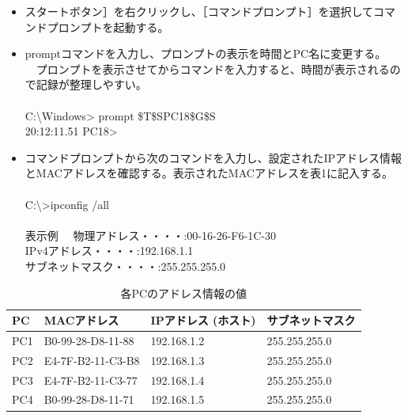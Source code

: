 \documentclass[10pt]{article}
\begin{document}
\begin{enumerate}
\begin{itemize}
                \item スタートボタン］を右クリックし、［コマンドプロンプト］を選択してコマンドプロンプトを起動する。
                \item promptコマンドを入力し、プロンプトの表示を時間とPC名に変更する。 　プロンプトを表示させてからコマンドを入力すると、時間が表示されるので記録が整理しやすい。
                     \\\\
                    C:\textbackslash Windows> prompt \$T\$SPC18\$G\$S \\
                    20:12:11.51 PC18>
                    \\
                \item コマンドプロンプトから次のコマンドを入力し、設定されたIPアドレス情報とMACアドレスを確認する。表示されたMACアドレスを表1に記入する。
                \\\\
                C:\textbackslash>ipconfig /all
                \\\\
                表示例 　物理アドレス・・・・:00-16-26-F6-1C-30 \\
                IPv4アドレス・・・・:192.168.1.1 \\
                サブネットマスク・・・・:255.255.255.0 \\
                    
            \end{itemize}
            \begingroup
            \setlength{\tabcolsep}{5pt} %
            \renewcommand{\arraystretch}{1.5} %
            \begin{table}[H]
            \centering
        	\caption{各PCのアドレス情報の値}
        	\begin{tabular}{|l|l|l|l|}
        	    \hline
        	    PC & MACアドレス & IPアドレス (ホスト) & サブネットマスク\\[0.5ex]
        		\hline\hline
        	PC1 & B0-99-28-D8-11-88 & 192.168.1.2 & 255.255.255.0 \\ \hline
            PC2 & E4-7F-B2-11-C3-B8 & 192.168.1.3 & 255.255.255.0 \\ \hline
            PC3 & E4-7F-B2-11-C3-77 & 192.168.1.4 & 255.255.255.0 \\ \hline
            PC4 & B0-99-28-D8-11-71 & 192.168.1.5 & 255.255.255.0　\\ \hline
        	\end{tabular}
        \end{table} 
        \endgroup
        

\end{enumerate}
\end{document}
